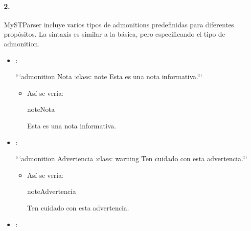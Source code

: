 \documentclass[a4paper,10pt,spanish]{sphinxmanual}
\begin{document}
\paragraph{2. }
\label{\detokenize{configuracion_inicial/013.guia_de_myst_parser:tipos-predefinidos-de-admonitions}}
\sphinxAtStartPar
MyST\sphinxhyphen{}Parser incluye varios tipos de admonitions predefinidas para diferentes propósitos. La sintaxis es similar a la básica, pero especificando el tipo de admonition.
\begin{itemize}
\item {} 
\sphinxAtStartPar
{}:

\begin{sphinxVerbatim}[commandchars=\\\{\}]
  ```\PYGZob{}admonition\PYGZcb{} Nota :class: note Esta es una nota informativa.```
\end{sphinxVerbatim}
\begin{itemize}
\item {} 
\sphinxAtStartPar
Así se vería:

\begin{sphinxadmonition}{note}{Nota}

\sphinxAtStartPar
Esta es una nota informativa.
\end{sphinxadmonition}

\end{itemize}

\item {} 
\sphinxAtStartPar
{}:

\begin{sphinxVerbatim}[commandchars=\\\{\}]
  ```\PYGZob{}admonition\PYGZcb{} Advertencia :class: warning Ten cuidado con esta advertencia.```
\end{sphinxVerbatim}
\begin{itemize}
\item {} 
\sphinxAtStartPar
Así se vería:

\begin{sphinxadmonition}{note}{Advertencia}

\sphinxAtStartPar
Ten cuidado con esta advertencia.
\end{sphinxadmonition}

\end{itemize}

\item {} 
\sphinxAtStartPar
{}:


\end{itemize}
\end{document}
